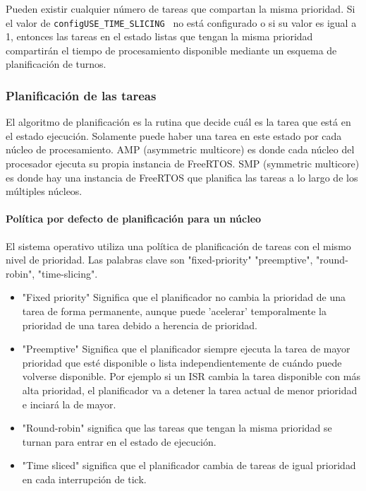     Pueden existir cualquier número de tareas que compartan la misma prioridad. Si el valor de \texttt{configUSE\_TIME\_SLICING } no está configurado o si su valor es igual a 1, entonces las tareas en el estado listas que tengan la misma prioridad compartirán el tiempo de procesamiento disponible mediante un esquema de planificación de turnos.
    
    \subsubsection{Planificación de las tareas}\label{plan_tar}
    
    El algoritmo de planificación es la rutina que decide cuál es la tarea que está en el estado ejecución. Solamente puede haber una tarea en este estado por cada núcleo de procesamiento. AMP (asymmetric multicore) es donde cada núcleo del procesador ejecuta su propia instancia de FreeRTOS. SMP (symmetric multicore) es donde hay una instancia de FreeRTOS que planifica las tareas a lo largo de los múltiples núcleos.
    
    \paragraph{Política por defecto de planificación para un núcleo}
    
    El sistema operativo utiliza una política de planificación de tareas con el mismo nivel de prioridad. Las palabras clave son "fixed-priority" "preemptive", "round-robin", "time-slicing".
    
    \begin{itemize}
        \item "Fixed priority" Significa que el planificador no cambia la prioridad de una tarea de forma permanente, aunque puede 'acelerar' temporalmente la prioridad de una tarea debido a herencia de prioridad.
        \item "Preemptive" Significa que el planificador siempre ejecuta la tarea de mayor prioridad que esté disponible o lista independientemente de cuándo puede volverse disponible. Por ejemplo si un ISR cambia la tarea disponible con más alta prioridad, el planificador va a detener la tarea actual de menor prioridad e inciará la de mayor.
        \item "Round-robin" significa que las tareas que tengan la misma prioridad se turnan para entrar en el estado de ejecución. 
        \item "Time sliced" significa que el planificador cambia de tareas de igual prioridad en cada interrupción de tick.
    \end{itemize}
    
